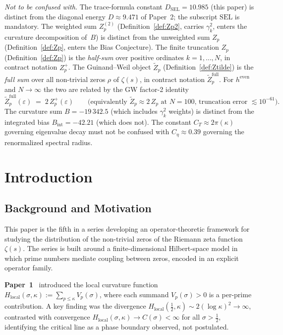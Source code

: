 \documentclass[11pt]{article}
\newcommand{\Hlocal}{H_{\mathrm{local}}}
\newcommand{\Zt}{\widetilde{Z}}
\newcommand{\DSEL}{D_{\mathrm{SEL}}}
\newcommand{\Ceta}{C_{\eta}}
\newcommand{\CT}{C_{T}}
\begin{document}
\medskip
\emph{Not to be confused with.}
The trace-formula constant $\DSEL=10.985$ (this paper) is distinct
from the diagonal energy $D\approx 9.471$ of Paper~2; the subscript
$\mathrm{SEL}$ is mandatory.
The weighted sum $Z_p^{(2)}$ (Definition~\ref{def:Zp2}, carries
$\gamma_k^2$, enters the curvature decomposition of~$B$) is distinct
from the unweighted sum $Z_p$ (Definition~\ref{def:Zp}, enters the
Bias Conjecture).
The finite truncation $Z_p$ (Definition~\ref{def:Zp}) is the
\emph{half-sum} over positive ordinates $k=1,\ldots,N$,
in contract notation $Z_p^{+}$. The Guinand--Weil object $\Zt_p$
(Definition~\ref{def:Ztilde}) is the \emph{full sum} over all
non-trivial zeros $\rho$ of $\zeta(s)$, in contract notation
$\widetilde Z_p^{\mathrm{full}}$. For $h^{\mathrm{even}}$ and
$N\to\infty$ the two are related by the GW factor-2 identity
\[
  \widetilde Z_p^{\mathrm{full}}(\varepsilon)
  \;=\; 2\,Z_p^{+}(\varepsilon)
  \qquad\text{(equivalently $\Zt_p \approx 2\,Z_p$ at $N=100$,
  truncation error $\lesssim 10^{-61}$).}
\]
The curvature sum $B=-19\,342.5$ (which includes
$\gamma_k^2$ weights) is distinct from the integrated bias
$B_{\mathrm{int}}=-42.21$ (which does not).
The constant $\CT\approx 2\pi(\kappa)$ governing eigenvalue decay
must not be confused with $\Ceta\approx 0.39$ governing the
renormalized spectral radius.

\newpage

\section{Introduction}
\label{sec:intro}

\subsection{Background and Motivation}

This paper is the fifth in a series developing an operator-theoretic
framework for studying the distribution of the non-trivial zeros of the
Riemann zeta function $\zeta(s)$. The series is built around a
finite-dimensional Hilbert-space model in which prime numbers
mediate coupling between zeros, encoded in an explicit operator family.

\textbf{Paper~1}~\cite{Paper1} introduced the local curvature function
$\Hlocal(\sigma,\kappa) := \sum_{p\leq\kappa}V_p(\sigma)$,
where each summand $V_p(\sigma)>0$ is a per-prime contribution.
A key finding was the divergence
$\Hlocal(\tfrac{1}{2},\kappa)\sim 2(\log\kappa)^2\to\infty$,
contrasted with convergence $\Hlocal(\sigma,\kappa)\to C(\sigma)<\infty$
for all $\sigma>\tfrac{1}{2}$, identifying the critical line as a phase
boundary observed, not postulated.
\end{document}
